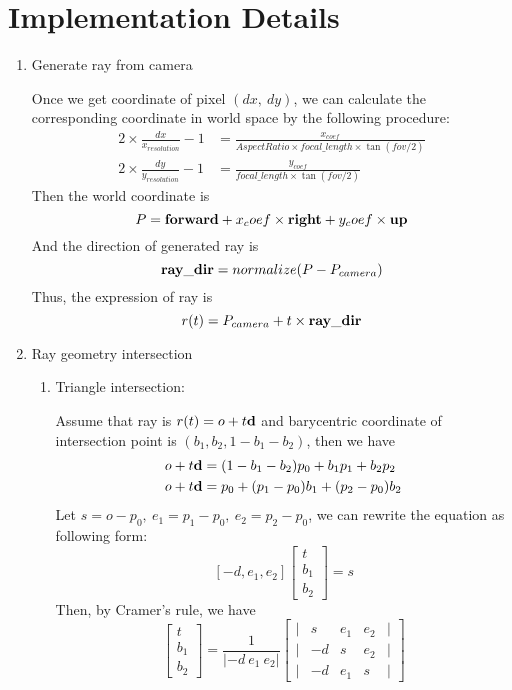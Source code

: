 \documentclass[acmtog]{acmart}
\begin{document}
\section{Implementation Details}
\begin{enumerate}
	\setlength\parindent{2em}
	\item Generate ray from camera
	\par Once we get coordinate of pixel $(dx,\ dy)$, we can calculate the corresponding coordinate in world space by the following procedure:
	\begin{align*}
		2\times\frac{dx}{x_{resolution}} - 1 &= \frac{x_{coef}}{AspectRatio\times focal\_length\times\tan(fov/2)}\\
		2\times\frac{dy}{y_{resolution}} - 1 &= \frac{y_{coef}}{focal\_length\times\tan(fov/2)}
	\end{align*}
	Then the world coordinate is 
	\[P =  {\bf forward} + x_coef\times {\bf right} + y_coef \times {\bf up}\]
	And the direction of generated ray is 
	\[{\bf ray\_dir}=normalize(P-P_{camera})\]
	Thus, the expression of ray is 
	\[r(t)=P_{camera}+t\times {\bf ray\_dir}\]
	\item Ray geometry intersection
	\begin{enumerate}
		\setlength\parindent{2em}
		\item Triangle intersection:
		\par Assume that ray is $r(t)=o+t{\bf d}$ and barycentric coordinate of intersection point is $(b_1,b_2, 1-b_1-b_2)$, then we have
		\begin{align*}
			o+t{\bf d}&=(1-b_1-b_2)p_0+b_1p_1+b_2p_2\\
			o+t{\bf d}&=p_0+(p_1-p_0)b_1+(p_2-p_0)b_2
		\end{align*}
		Let $s=o-p_0,\ e_1=p_1-p_0,\ e_2=p_2-p_0$, we can rewrite the equation as following form:
		\[[-d,e_1,e_2]\begin{bmatrix}
			t\\ b_1\\ b_2
		\end{bmatrix}=s\]
		Then, by Cramer's rule, we have
		\[\begin{bmatrix}
		t\\ b_1\\ b_2
	\end{bmatrix}=\frac{1}{|-d\ e_1\ e_2|}\begin{bmatrix}
		|&s & e_1 & e_2&|\\
		|&-d & s & e_2&|\\
		|&-d & e_1 & s&|
	\end{bmatrix}\]

\end{enumerate}
\end{enumerate}
\end{document}
